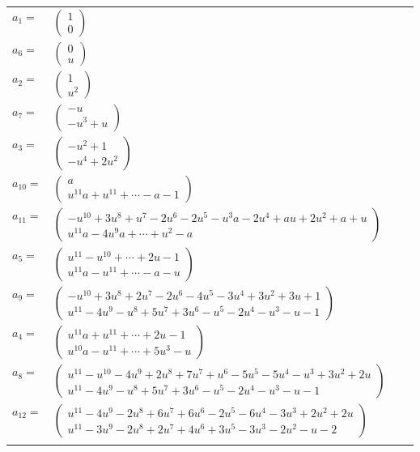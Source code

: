 \documentclass[1p]{elsarticle_modified}
\theoremstyle{definition}
\begin{document}
\begin{tabular}{m{7pt} m{180pt} m{7pt} m{180pt} }
\flushright $a_{1}=$&$\begin{pmatrix}1\\0\end{pmatrix}$ \\
\flushright $a_{6}=$&$\begin{pmatrix}0\\u\end{pmatrix}$ \\
\flushright $a_{2}=$&$\begin{pmatrix}1\\u^2\end{pmatrix}$ \\
\flushright $a_{7}=$&$\begin{pmatrix}- u\\- u^3+u\end{pmatrix}$ \\
\flushright $a_{3}=$&$\begin{pmatrix}- u^2+1\\- u^4+2 u^2\end{pmatrix}$ \\
\flushright $a_{10}=$&$\begin{pmatrix}a\\u^{11} a+u^{11}+\cdots- a-1\end{pmatrix}$ \\
\flushright $a_{11}=$&$\begin{pmatrix}- u^{10}+3 u^8+u^7-2 u^6-2 u^5- u^3 a-2 u^4+a u+2 u^2+a+u\\u^{11} a-4 u^9 a+\cdots+u^2- a\end{pmatrix}$ \\
\flushright $a_{5}=$&$\begin{pmatrix}u^{11}- u^{10}+\cdots+2 u-1\\u^{11} a- u^{11}+\cdots- a- u\end{pmatrix}$ \\
\flushright $a_{9}=$&$\begin{pmatrix}- u^{10}+3 u^8+2 u^7-2 u^6-4 u^5-3 u^4+3 u^2+3 u+1\\u^{11}-4 u^9- u^8+5 u^7+3 u^6- u^5-2 u^4- u^3- u-1\end{pmatrix}$ \\
\flushright $a_{4}=$&$\begin{pmatrix}u^{11} a+u^{11}+\cdots+2 u-1\\u^{10} a- u^{11}+\cdots+5 u^3- u\end{pmatrix}$ \\
\flushright $a_{8}=$&$\begin{pmatrix}u^{11}- u^{10}-4 u^9+2 u^8+7 u^7+u^6-5 u^5-5 u^4- u^3+3 u^2+2 u\\u^{11}-4 u^9- u^8+5 u^7+3 u^6- u^5-2 u^4- u^3- u-1\end{pmatrix}$ \\
\flushright $a_{12}=$&$\begin{pmatrix}u^{11}-4 u^9-2 u^8+6 u^7+6 u^6-2 u^5-6 u^4-3 u^3+2 u^2+2 u\\u^{11}-3 u^9-2 u^8+2 u^7+4 u^6+3 u^5-3 u^3-2 u^2- u-2\end{pmatrix}$\\&\end{tabular}
\end{document}
